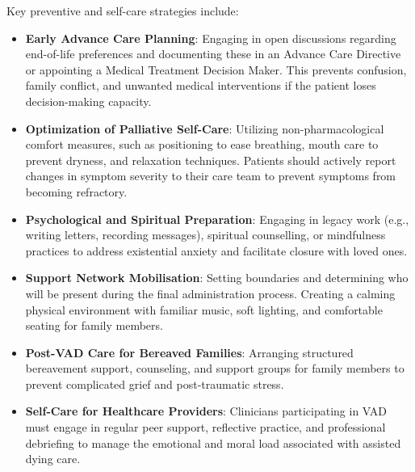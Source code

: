 Key preventive and self-care strategies include:
\begin{itemize}
    \item \textbf{Early Advance Care Planning}: Engaging in open discussions regarding end-of-life preferences and documenting these in an Advance Care Directive or appointing a Medical Treatment Decision Maker. This prevents confusion, family conflict, and unwanted medical interventions if the patient loses decision-making capacity.
    \item \textbf{Optimization of Palliative Self-Care}: Utilizing non-pharmacological comfort measures, such as positioning to ease breathing, mouth care to prevent dryness, and relaxation techniques. Patients should actively report changes in symptom severity to their care team to prevent symptoms from becoming refractory.
    \item \textbf{Psychological and Spiritual Preparation}: Engaging in legacy work (e.g., writing letters, recording messages), spiritual counselling, or mindfulness practices to address existential anxiety and facilitate closure with loved ones.
    \item \textbf{Support Network Mobilisation}: Setting boundaries and determining who will be present during the final administration process. Creating a calming physical environment with familiar music, soft lighting, and comfortable seating for family members.
    \item \textbf{Post-VAD Care for Bereaved Families}: Arranging structured bereavement support, counseling, and support groups for family members to prevent complicated grief and post-traumatic stress.
    \item \textbf{Self-Care for Healthcare Providers}: Clinicians participating in VAD must engage in regular peer support, reflective practice, and professional debriefing to manage the emotional and moral load associated with assisted dying care.
\end{itemize}

